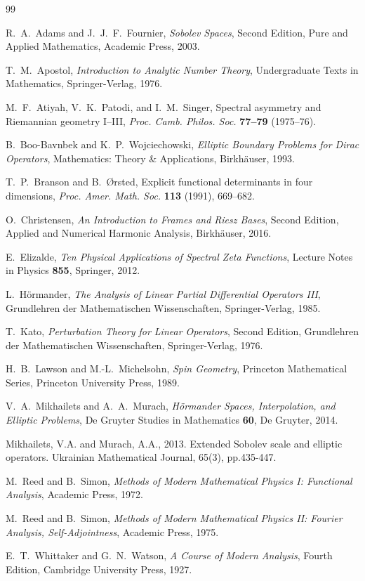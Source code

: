 \documentclass[11pt]{amsart}
\theoremstyle{definition}
\theoremstyle{remark}
\begin{document}
\begin{thebibliography}{99}

R.~A.~Adams and J.~J.~F.~Fournier, \emph{Sobolev Spaces}, Second Edition, Pure and Applied Mathematics, Academic Press, 2003.

T.~M.~Apostol, \emph{Introduction to Analytic Number Theory}, 
Undergraduate Texts in Mathematics, Springer-Verlag, 1976.

M.~F.~Atiyah, V.~K.~Patodi, and I.~M.~Singer, Spectral asymmetry and Riemannian geometry I--III, \emph{Proc. Camb. Philos. Soc.} \textbf{77--79} (1975--76).

B.~Boo-Bavnbek and K.~P.~Wojciechowski, \emph{Elliptic Boundary Problems for Dirac Operators}, Mathematics: Theory \& Applications, Birkh\"auser, 1993.

T.~P.~Branson and B.~\O rsted, Explicit functional determinants in four dimensions, \emph{Proc. Amer. Math. Soc.} \textbf{113} (1991), 669--682.

O.~Christensen, \emph{An Introduction to Frames and Riesz Bases}, Second Edition, Applied and Numerical Harmonic Analysis, Birkh\"auser, 2016.

E.~Elizalde, \emph{Ten Physical Applications of Spectral Zeta Functions}, 
Lecture Notes in Physics \textbf{855}, Springer, 2012.

L.~H\"ormander, \emph{The Analysis of Linear Partial Differential Operators III}, Grundlehren der Mathematischen Wissenschaften, Springer-Verlag, 1985.

T.~Kato, \emph{Perturbation Theory for Linear Operators}, Second Edition, Grundlehren der Mathematischen Wissenschaften, Springer-Verlag, 1976.

H.~B.~Lawson and M.-L.~Michelsohn, \emph{Spin Geometry}, Princeton Mathematical Series, Princeton University Press, 1989.

V.~A.~Mikhailets and A.~A.~Murach, \emph{H\"ormander Spaces, Interpolation, and Elliptic Problems}, De Gruyter Studies in Mathematics \textbf{60}, De Gruyter, 2014.

Mikhailets, V.A. and Murach, A.A., 2013. Extended Sobolev scale and elliptic operators. Ukrainian Mathematical Journal, 65(3), pp.435-447.

M.~Reed and B.~Simon, \emph{Methods of Modern Mathematical Physics I: Functional Analysis}, Academic Press, 1972.

M.~Reed and B.~Simon, \emph{Methods of Modern Mathematical Physics II: Fourier Analysis, Self-Adjointness}, Academic Press, 1975.

E.~T.~Whittaker and G.~N.~Watson, \emph{A Course of Modern Analysis}, 
Fourth Edition, Cambridge University Press, 1927.

\end{thebibliography}
\end{document}

